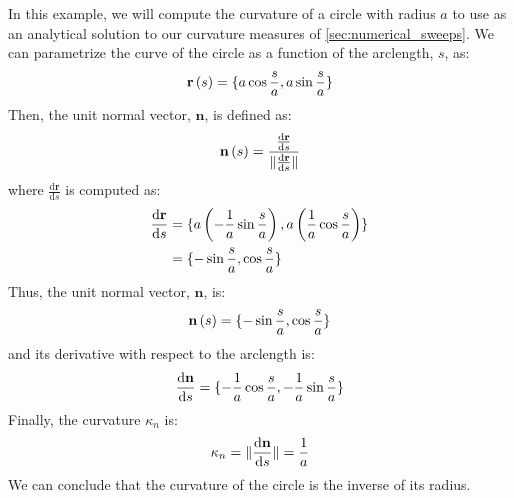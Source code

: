 In this example, we will compute the curvature of a circle with radius $a$ to use as an analytical solution to our curvature measures of \ref{sec:numerical_sweeps}. We can parametrize the curve of the circle as a function of the arclength, $s$, as:
%
\begin{equation}
	\centering
	\label{eq:position_vector}
	\mathbf{r}\left( s \right) = \lbrace a\cos\frac{s}{a}, a\sin\frac{s}{a} \rbrace
\end{equation}
%
Then, the unit normal vector, $\mathbf{n}$, is defined as:
%
\begin{equation}
	\centering
	\label{eq:unit_normal_vector}
	\mathbf{n} \left( s \right) = \frac{\frac{\mathrm{d}\mathbf{r}}{\mathrm{d}s}}{\Vert \frac{\mathrm{d}\mathbf{r}}{\mathrm{d}s}\Vert}
\end{equation}
%
where $\frac{\mathrm{d}\mathbf{r}}{\mathrm{d}s}$ is computed as:
%
\begin{equation}
	\centering
	\label{eq:position_vector_derivative}
	\begin{split}
	\frac{\mathrm{d}\mathbf{r}}{\mathrm{d}s} & = \lbrace a \left( -\frac{1}{a} \sin\frac{s}{a} \right), a \left( \frac{1}{a} \cos\frac{s}{a} \right) \rbrace \\
	                                         & = \lbrace -\sin\frac{s}{a}, \cos\frac{s}{a} \rbrace
	\end{split}
\end{equation}
%
Thus, the unit normal vector, $\mathbf{n}$, is: 
%
\begin{equation}
	\centering
	\label{eq:unit_normal_vector_def}
	\mathbf{n} \left( s \right) = \lbrace - \sin \frac{s}{a}, \cos \frac{s}{a} \rbrace
\end{equation}
%
and its derivative with respect to the arclength is:
%
\begin{equation}
	\centering
	\label{eq:unit_normal_vector_derivative}
	\frac{\mathrm{d}\mathbf{n}}{\mathrm{d}s} = \lbrace -\frac{1}{a} \cos \frac{s}{a}, -\frac{1}{a} \sin \frac{s}{a} \rbrace
\end{equation}
%
Finally, the curvature $\kappa_{n}$ is:
%
\begin{equation}
	\centering
	\label{eq:curvature_solution}
	\kappa_{n} = \Vert \frac{\mathrm{d} \mathbf{n}}{\mathrm{d}s} \Vert = \frac{1}{a}
\end{equation}
%
We can conclude that the curvature of the circle is the inverse of its radius.


